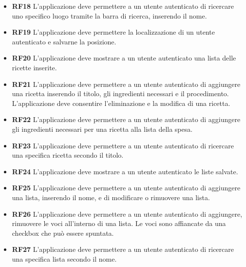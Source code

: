 \documentclass[a4paper,12pt]{article}
\begin{document}
\begin{itemize}
\item \textbf {\hypertarget{RF18}{RF18}} L'applicazione deve permettere a un utente autenticato di ricercare uno specifico luogo tramite la barra di ricerca, inserendo il nome.
\item \textbf {\hypertarget{RF19}{RF19}} L'applicazione deve permettere la localizzazione di un utente autenticato e salvarne la posizione.
\item \textbf {\hypertarget{RF20}{RF20}} L'applicazione deve mostrare a un utente autenticato una lista delle ricette inserite.
\item \textbf {\hypertarget{RF21}{RF21}} L'applicazione deve permettere a un utente autenticato di aggiungere una ricetta inserendo il titolo, gli ingredienti necessari e il procedimento. L'applicazione deve consentire l'eliminazione e la modifica di una ricetta.
\item \textbf {\hypertarget{RF22}{RF22}} L'applicazione deve permettere a un utente autenticato di aggiungere gli ingredienti necessari per una ricetta alla lista della spesa.
\item \textbf {\hypertarget{RF23}{RF23}} L'applicazione deve permettere a un utente autenticato di ricercare una specifica ricetta secondo il titolo.
\item \textbf {\hypertarget{RF24}{RF24}} L'applicazione deve mostrare a un utente autenticato le liste salvate.
\item \textbf {\hypertarget{RF25}{RF25}} L'applicazione deve permettere a un utente autenticato di aggiungere una lista, inserendo il nome, e di modificare o rimuovere una lista.
\item \textbf {\hypertarget{RF26}{RF26}} L'applicazione deve permettere a un utente autenticato di aggiungere, rimuovere le voci all'interno di una lista. Le voci sono affiancate da una checkbox che può essere spuntata.
\item \textbf {\hypertarget{RF27}{RF27}} L'applicazione deve permettere a un utente autenticato di ricercare una specifica lista secondo il nome.
\end{itemize}
\end{document}
